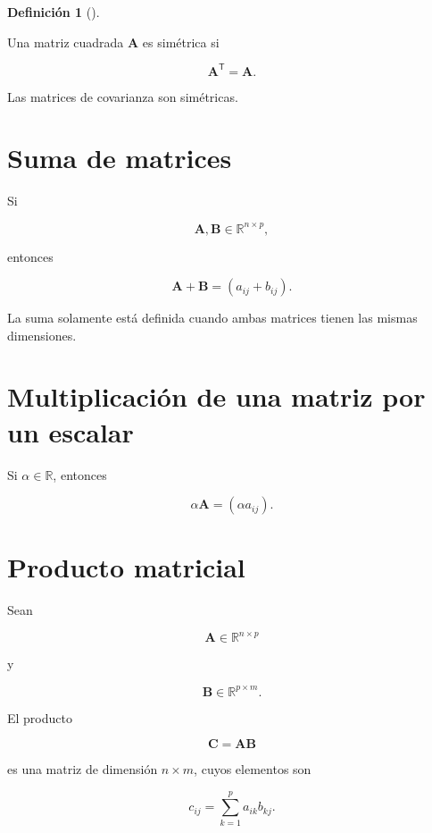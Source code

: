 \documentclass[
  spanish,
  11pt,
  letterpaper,
  DIV=11,
  numbers=noendperiod]{scrreprt}
\theoremstyle{definition}
\newtheorem{definition}{Definición}[chapter]
\theoremstyle{plain}
\theoremstyle{definition}
\theoremstyle{remark}
\begin{document}
\begin{definition}[]\protect\hypertarget{def-matriz-simetrica}{}\label{def-matriz-simetrica}

Una matriz cuadrada \(\mathbf{A}\) es simétrica si

\[
\mathbf{A}^{\mathsf T}=\mathbf{A}.
\]

\end{definition}

Las matrices de covarianza son simétricas.

\section{Suma de matrices}\label{suma-de-matrices}

Si

\[
\mathbf{A},\mathbf{B}\in\mathbb{R}^{n\times p},
\]

entonces

\[
\mathbf{A}+\mathbf{B}
=
(a_{ij}+b_{ij}).
\]

La suma solamente está definida cuando ambas matrices tienen las mismas
dimensiones.

\section{Multiplicación de una matriz por un
escalar}\label{multiplicaciuxf3n-de-una-matriz-por-un-escalar}

Si \(\alpha\in\mathbb{R}\), entonces

\[
\alpha\mathbf{A}
=
(\alpha a_{ij}).
\]

\section{Producto matricial}\label{producto-matricial}

Sean

\[
\mathbf{A}\in\mathbb{R}^{n\times p}
\]

y

\[
\mathbf{B}\in\mathbb{R}^{p\times m}.
\]

El producto

\[
\mathbf{C}
=
\mathbf{A}\mathbf{B}
\]

es una matriz de dimensión \(n\times m\), cuyos elementos son

\[
c_{ij}
=
\sum_{k=1}^{p}
a_{ik}b_{kj}.
\]
\end{document}

